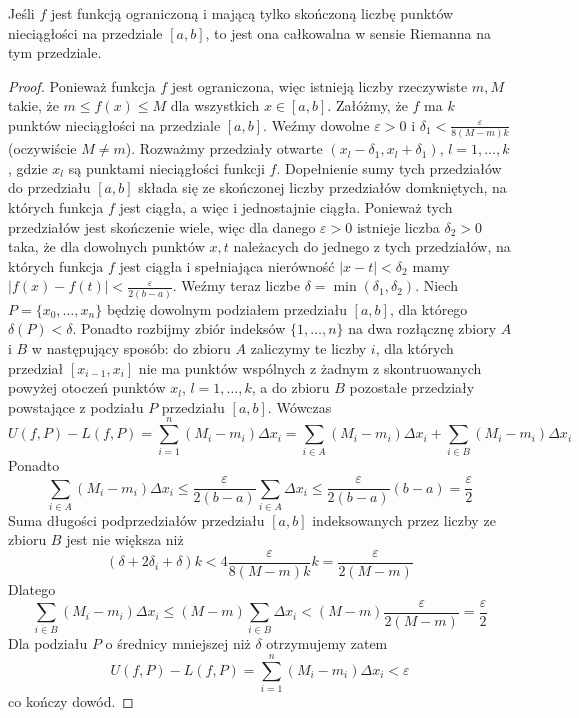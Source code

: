 \documentclass[leqno]{article}
\begin{document}
\begin{justify}
\begin{theorem}
    {Jeśli $f$ jest funkcją ograniczoną i mającą tylko skończoną liczbę punktów nieciągłości na przedziale $[a,b]$, to jest ona całkowalna w sensie Riemanna na tym przedziale.}
\end{theorem}

\begin{proof}
    Ponieważ funkcja $f$ jest ograniczona, więc istnieją liczby rzeczywiste $m, M$ takie, że $m \leqslant f(x) \leqslant M$
    dla wszystkich $x \in [a,b]$. Załóżmy, że $f$ ma $k$ punktów nieciągłości na przedziale $[a,b]$. 
    Weźmy dowolne $\varepsilon > 0$ i $\delta_1 < \frac{\varepsilon}{8(M-m)k}$ (oczywiście $M \neq m$).
    Rozważmy przedziały otwarte $(x_l - \delta_1, x_l + \delta_1)$, $l = 1, \ldots, k$, gdzie $x_l$ są punktami
    nieciągłości funkcji $f$. Dopełnienie sumy tych przedziałów do przedziału $[a,b]$ składa się ze skończonej
    liczby przedziałów domkniętych, na których funkcja $f$ jest ciągła, a więc i jednostajnie ciągła. Ponieważ tych przedziałów
    jest skończenie wiele, więc dla danego $\varepsilon > 0$ istnieje liczba $\delta_2 > 0$ taka, że dla dowolnych
    punktów $x, t$ należacych do jednego z tych przedziałów, na których funkcja $f$ jest ciągła i spełniająca nierówność $|x-t| < \delta_2$ mamy
    $|f(x)-f(t)|<\frac{\varepsilon}{2(b-a)}$. Weźmy teraz liczbe $\delta = \min{(\delta_1, \delta_2)}$.
    Niech $P = \{x_0,\ldots,x_n\}$ będzię dowolnym podziałem przedziału $[a,b]$, dla którego $\delta(P) < \delta$. Ponadto
    rozbijmy zbiór indeksów $\{1, \ldots, n\}$ na dwa rozłącznę zbiory $A$ i $B$ w następujący sposób: do zbioru $A$ zaliczymy te liczby $i$, 
    dla których przedział $[x_{i-1}, x_i]$ nie ma punktów wspólnych z żadnym z skontruowanych powyżej otoczeń punktów $x_l$, $l=1,\ldots,k$, a do zbioru $B$
    pozostałe przedziały powstające z podziału $P$ przedziału $[a,b]$. Wówczas
    \[
        U(f, P) - L(f, P) = \sum_{i=1}^{n}(M_i - m_i)\Delta x_i = \sum_{i \in A}(M_i - m_i)\Delta x_i + \sum_{i \in B}(M_i - m_i)\Delta x_i
    \]
    Ponadto
    \[
        \sum_{i \in A}(M_i - m_i)\Delta x_i \leqslant \frac{\varepsilon}{2(b-a)}\sum_{i \in A}\Delta x_i \leqslant \frac{\varepsilon}{2(b-a)}(b-a)=\frac{\varepsilon}{2}
    \]
    Suma długości podprzedziałów przedziału $[a,b]$ indeksowanych przez liczby ze zbioru $B$ jest nie większa niż
    \[
        (\delta + 2\delta_i+\delta)k < 4 \frac{\varepsilon}{8(M-m)k}k = \frac{\varepsilon}{2(M-m)}
    \]
    Dlatego
    \[
        \sum_{i \in B}(M_i - m_i)\Delta x_i \leqslant (M-m)\sum_{i \in B}\Delta x_i < (M-m)\frac{\varepsilon}{2(M-m)}=\frac{\varepsilon}{2}
    \]
    Dla podziału $P$ o średnicy mniejszej niż $\delta$ otrzymujemy zatem
    \[
        U(f, P) - L(f, P) = \sum_{i=1}^{n}(M_i - m_i)\Delta x_i < \varepsilon
    \]
    co kończy dowód.
\end{proof}


\end{justify}
\end{document}
